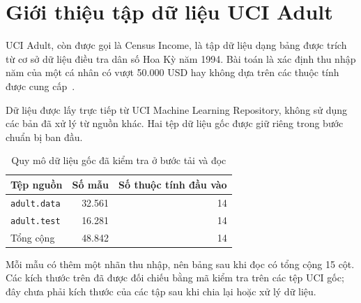 \section{Giới thiệu tập dữ liệu UCI Adult}
\label{sec:3_1}
UCI Adult, còn được gọi là Census Income, là tập dữ liệu dạng bảng được trích từ cơ sở dữ liệu điều tra dân số Hoa Kỳ năm 1994. Bài toán là xác định thu nhập năm của một cá nhân có vượt 50.000 USD hay không dựa trên các thuộc tính được cung cấp~\cite{uci-adult}.

Dữ liệu được lấy trực tiếp từ UCI Machine Learning Repository, không sử dụng các bản đã xử lý từ nguồn khác. Hai tệp dữ liệu gốc được giữ riêng trong bước chuẩn bị ban đầu.

\begin{table}[htbp]
\centering
\caption{Quy mô dữ liệu gốc đã kiểm tra ở bước tải và đọc}
\label{tab:original-data-size}
\begin{tabular}{lrr}
\toprule
Tệp nguồn & Số mẫu & Số thuộc tính đầu vào \\
\midrule
\texttt{adult.data} & 32.561 & 14 \\
\texttt{adult.test} & 16.281 & 14 \\
\midrule
Tổng cộng & 48.842 & 14 \\
\bottomrule
\end{tabular}
\end{table}

Mỗi mẫu có thêm một nhãn thu nhập, nên bảng sau khi đọc có tổng cộng 15 cột. Các kích thước trên đã được đối chiếu bằng mã kiểm tra trên các tệp UCI gốc; đây chưa phải kích thước của các tập sau khi chia lại hoặc xử lý dữ liệu.

